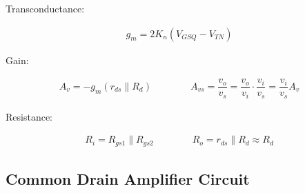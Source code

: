 Transconductance:

\begin{equation*}
  \begin{aligned}
    g_m = 2 K_n \left( V_{GSQ} - V_{TN} \right)
  \end{aligned}
\end{equation*}

Gain:

\begin{equation*}
  \begin{aligned}
    A_v = - g_m \left( r_{ds} \parallel R_d \right) \quad\quad \quad\quad 
    A_{vs} = \dfrac{v_o}{v_s} = \dfrac{v_o}{v_i} \cdot \dfrac{v_i}{v_s} = \dfrac{v_i}{v_s} A_v
  \end{aligned}
\end{equation*}

Resistance:

\begin{equation*}
  \begin{aligned}
    R_i = R_{gs1} \parallel R_{gs2} \quad\quad \quad\quad 
    R_o = r_{ds} \parallel R_d \approx R_d
  \end{aligned}
\end{equation*}

\subsection{Common Drain Amplifier Circuit}

